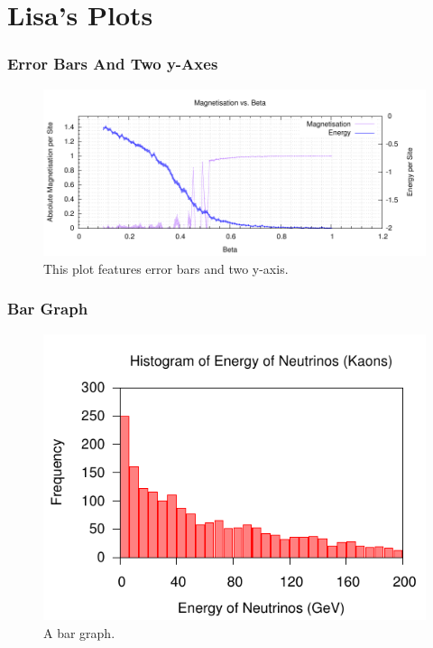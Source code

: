 \documentclass[10pt,a4paper,final]{report}
\begin{document}
\part*{Lisa's Plots}
\setcounter{section}{0}

\section{Error Bars And Two y-Axes}
\begin{figure}[!hbtp]
\centering
\includegraphics[width=\textwidth]{../CodeLisa/BETAM/BETA2.pdf}
\caption{This plot features error bars and two y-axis.}
\end{figure}


\section{Bar Graph}
\begin{figure}[!hbtp]
\centering
\includegraphics[width=\textwidth]{../CodeLisa/HIST/NEUTMOMK.pdf}
\caption{A bar graph.}
\end{figure}

\end{document}
